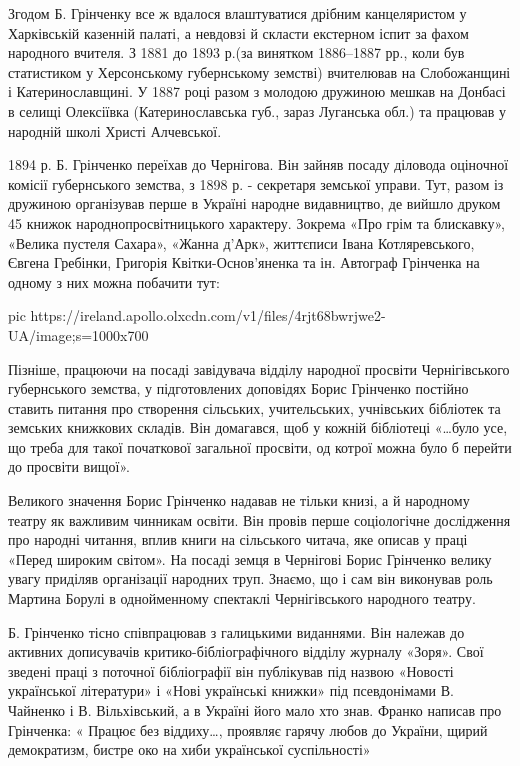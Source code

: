 Згодом Б. Грінченку все ж вдалося влаштуватися дрібним канцеляристом у
Харківській казенній палаті, а невдовзі й скласти екстерном іспит за фахом
народного вчителя. З 1881 до 1893 р.(за винятком 1886–1887 рр., коли був
статистиком у Херсонському губернському земстві) вчителював на Слобожанщині і
Катеринославщині. У 1887 році разом з молодою дружиною мешкав на Донбасі в
селищі Олексіївка (Катеринославська губ., зараз Луганська обл.) та працював у
народній школі Христі Алчевської.

1894 р. Б. Грінченко переїхав до Чернігова. Він зайняв посаду діловода
оціночної комісії губернського земства, з 1898 р. - секретаря земської управи.
Тут, разом із дружиною організував перше в Україні народне видавництво, де
вийшло друком 45 книжок народнопросвітницького характеру. Зокрема «Про грім та
блискавку», «Велика пустеля Сахара», «Жанна д'Арк», життєписи Івана
Котляревського, Євгена Гребінки, Григорія Квітки-Основ'яненка та ін. Автограф
Грінченка на одному з них можна побачити тут:

\ifcmt
pic https://ireland.apollo.olxcdn.com/v1/files/4rjt68bwrjwe2-UA/image;s=1000x700
\fi

Пізніше, працюючи на посаді завідувача відділу народної просвіти Чернігівського
губернського земства, у підготовлених доповідях Борис Грінченко постійно
ставить питання про створення сільських, учительських, учнівських бібліотек та
земських книжкових складів. Він домагався, щоб у кожній бібліотеці «…було усе,
що треба для такої початкової загальної просвіти, од котрої можна було б
перейти до просвіти вищої».

Великого значення Борис Грінченко надавав не тільки книзі, а й народному театру
як важливим чинникам освіти. Він провів перше соціологічне дослідження про
народні читання, вплив книги на сільського читача, яке описав у праці «Перед
широким світом». На посаді земця в Чернігові Борис Грінченко велику увагу
приділяв організації народних труп. Знаємо, що і сам він виконував роль Мартина
Борулі в однойменному спектаклі Чернігівського народного театру.

Б. Грінченко тісно співпрацював з галицькими виданнями. Він належав до активних
дописувачів критико-бібліографічного відділу журналу «Зоря». Свої зведені праці
з поточної бібліографії він публікував під назвою «Новості української
літератури» і «Нові українські книжки» під псевдонімами В. Чайненко і В.
Вільхівський, а в Україні його мало хто знав. Франко написав  про Грінченка: «
Працює без віддиху…, проявляє гарячу любов до України, щирий демократизм,
бистре око на хиби української суспільності»

